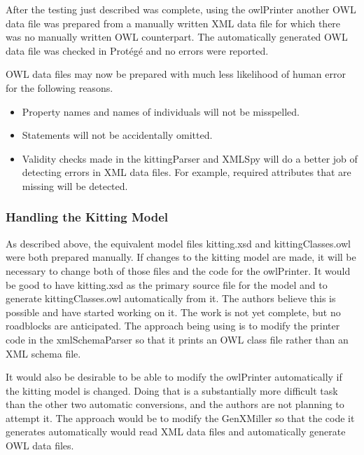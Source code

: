 After the testing just described was complete, using the owlPrinter
another OWL data file was prepared from a manually written XML data file
for which there was no manually written OWL counterpart. The automatically
generated OWL data file was checked in  Prot\'{e}g\'{e} and no errors were reported.

OWL data files
may now be prepared with much less likelihood of human error for the following
reasons.
\begin{itemize}

\item Property names and names of individuals will not be misspelled.

\item Statements will not be accidentally omitted.

\item Validity checks made in the kittingParser and XMLSpy will do a
  better job of detecting errors in XML data files. For example, required
  attributes that are missing will be detected.

\end{itemize}

\subsubsection{Handling the Kitting Model}
As described above, the equivalent model files kitting.xsd and
kittingClasses.owl were both prepared manually. If changes to the kitting
model are made, it will be necessary to change both of those files and the
code for the owlPrinter. It would be good to have kitting.xsd as the
primary source file for the model and to generate kittingClasses.owl
automatically from it. The authors believe this is possible and have
started working on it. The work is not yet complete, but no roadblocks are
anticipated. The approach being using is to modify the printer code in the
xmlSchemaParser so that it prints an OWL class file rather than an XML
schema file.

It would also be desirable to be able to modify the owlPrinter
automatically if the kitting model is changed. Doing that is a
substantially more difficult task than the other two automatic conversions,
and the authors are not planning to attempt it. The approach would be to
modify the GenXMiller so that the code it generates automatically would
read XML data files and automatically generate OWL data files.



